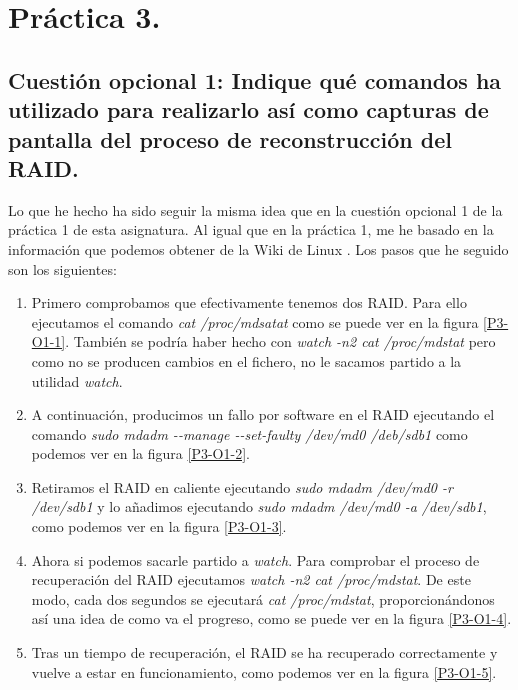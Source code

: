 \documentclass[a4paper,titlepage,12pt]{report}	%
\numberwithin{figure}{section} %
\numberwithin{table}{section} %
\begin{document}
	\chapter[Práctica 3.]{Práctica 3.}
	
	\section[Cuestión opcional 1: Indique qué comandos ha utilizado para realizarlo así	como capturas de pantalla del proceso de reconstrucción del RAID.]{Cuestión opcional 1: Indique qué comandos ha utilizado para realizarlo así	como capturas de pantalla del proceso de reconstrucción del RAID.}

	Lo que he hecho ha sido seguir la misma idea que en la cuestión opcional 1 de la práctica 1 de esta asignatura. Al igual que en la práctica 1, me he basado en la información que podemos obtener de la Wiki de Linux \cite{raid}. Los pasos que he seguido son los siguientes:

	\begin{enumerate}
	   \item Primero comprobamos que efectivamente tenemos dos RAID. Para ello ejecutamos el comando \textit{cat /proc/mdsatat} como se puede ver en la figura \ref{P3-O1-1}. También se podría haber hecho con \textit{watch -n2 cat /proc/mdstat} pero como no se producen cambios en el fichero, no le sacamos partido a la utilidad \textit{watch}.
	   \item A continuación, producimos un fallo por software en el RAID ejecutando el comando \textit{sudo mdadm -{-}manage -{-}set-faulty /dev/md0 /deb/sdb1} como podemos ver en la figura \ref{P3-O1-2}.
	   \item Retiramos el RAID en caliente ejecutando \textit{sudo mdadm /dev/md0 -r /dev/sdb1} y lo añadimos ejecutando \textit{sudo mdadm /dev/md0 -a /dev/sdb1}, como podemos ver en la figura \ref{P3-O1-3}.
	   \item Ahora si podemos sacarle partido a \textit{watch}. Para comprobar el proceso de recuperación del RAID ejecutamos \textit{watch -n2 cat /proc/mdstat}. De este modo, cada dos segundos se ejecutará \textit{cat /proc/mdstat}, proporcionándonos así una idea de como va el progreso, como se puede ver en la figura \ref{P3-O1-4}.
	   \item Tras un tiempo de recuperación, el RAID se ha recuperado correctamente y vuelve a estar en funcionamiento, como podemos ver en la figura \ref{P3-O1-5}.
	\end{enumerate}
\end{document}
